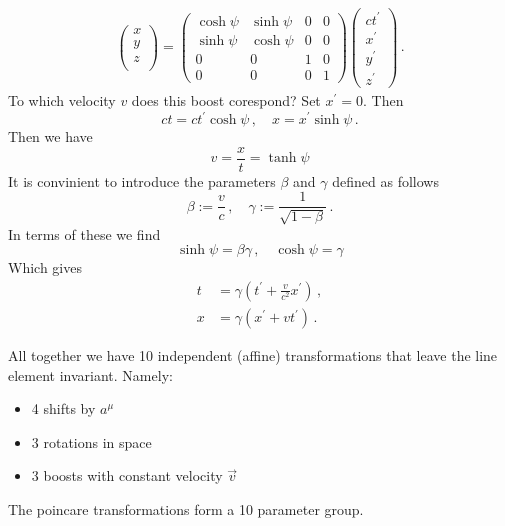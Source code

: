 \begin{enumerate}
\begin{align*}
\begin{pmatrix}
  x\\
  y\\
  z\\
  \end{pmatrix}=
  \begin{pmatrix}
  \cosh\psi&\sinh\psi & 0&0\\
  \sinh\psi&\cosh\psi &0&0\\
  0&0&1 &0\\
  0&0 &0 &1
  \end{pmatrix}
  \begin{pmatrix}
  ct^\prime\\
  x^\prime\\
  y^\prime\\
  z^\prime
  \end{pmatrix}\, .
  \end{align*}
  To which velocity $v$ does this boost corespond? Set $x^\prime= 0$. Then 
  \begin{equation}
  ct=ct^\prime\cosh\psi\, ,\quad
  x=x^\prime\sinh\psi\, .
  \end{equation}
  Then we have 
  \begin{equation}
  v=\frac{x}{t}=\tanh\psi
  \end{equation}
  It is convinient to introduce the parameters $\beta$ and $\gamma$ defined as
  follows
  \begin{equation}
  \beta:=\frac{v}{c}\, ,\quad\gamma:=\frac{1}{\sqrt{1-\beta}}\, .
  \end{equation}
  In terms of these we find
  \begin{equation}
  \sinh\psi = \beta\gamma\, , \quad \cosh\psi=\gamma
  \end{equation}
  Which gives 
  \begin{align}
  t&=\gamma\left(t^\prime+\frac{v}{c^2}x^\prime\right)\, ,\\
  x&=\gamma\left(x^\prime+vt^\prime\right)\, .
  \end{align}
\end{enumerate}
All together we have 10 independent (affine) transformations that leave the line
element invariant. Namely:
\begin{itemize}
  \item 4 shifts by $a^\mu$
  \item 3 rotations in space
  \item 3 boosts with constant velocity $\vec{v}$
\end{itemize}
The poincare transformations form a 10 parameter group.
